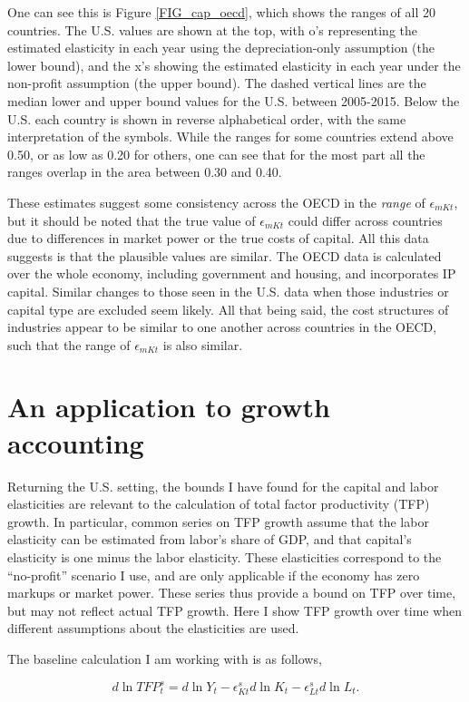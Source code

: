\documentclass[11pt]{article}
\begin{document}
One can see this is Figure \ref{FIG_cap_oecd}, which shows the ranges of all 20 countries. The U.S. values are shown at the top, with o's representing the estimated elasticity in each year using the depreciation-only assumption (the lower bound), and the x's showing the estimated elasticity in each year under the non-profit assumption (the upper bound). The dashed vertical lines are the median lower and upper bound values for the U.S. between 2005-2015. Below the U.S. each country is shown in reverse alphabetical order, with the same interpretation of the symbols. While the ranges for some countries extend above 0.50, or as low as 0.20 for others, one can see that for the most part all the ranges overlap in the area between 0.30 and 0.40. 

These estimates suggest some consistency across the OECD in the \textit{range} of $\epsilon_{mKt}$, but it should be noted that the true value of $\epsilon_{mKt}$ could differ across countries due to differences in market power or the true costs of capital. All this data suggests is that the plausible values are similar. The OECD data is calculated over the whole economy, including government and housing, and incorporates IP capital. Similar changes to those seen in the U.S. data when those industries or capital type are excluded seem likely. All that being said, the cost structures of industries appear to be similar to one another across countries in the OECD, such that the range of $\epsilon_{mKt}$ is also similar.

\section{An application to growth accounting}
Returning the U.S. setting, the bounds I have found for the capital and labor elasticities are relevant to the calculation of total factor productivity (TFP) growth. In particular, common series on TFP growth assume that the labor elasticity can be estimated from labor's share of GDP, and that capital's elasticity is one minus the labor elasticity. These elasticities correspond to the ``no-profit'' scenario I use, and are only applicable if the economy has zero markups or market power. These series thus provide a bound on TFP over time, but may not reflect actual TFP growth. Here I show TFP growth over time when different assumptions about the elasticities are used. 

The baseline calculation I am working with is as follows,

\begin{equation}
	d \ln TFP^s_t = d \ln Y_t - \epsilon^s_{Kt} d \ln K_t - \epsilon^s_{Lt} d \ln L_t. \label{EQ_accounting}
\end{equation}
\end{document}
